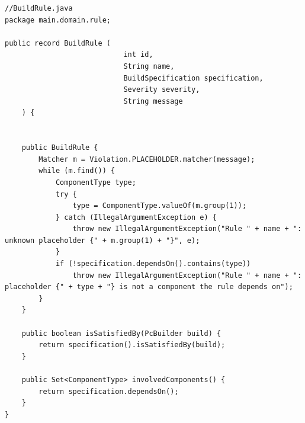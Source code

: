 \documentclass[12pt,a4paper]{article}
\begin{document}
\begin{lstlisting}[style=intellijlight, caption={A simple Java class}, label={lst:hello}]
//BuildRule.java
package main.domain.rule;

public record BuildRule (
                            int id,
                            String name,
                            BuildSpecification specification,
                            Severity severity,
                            String message
    ) {


    public BuildRule {
        Matcher m = Violation.PLACEHOLDER.matcher(message);
        while (m.find()) {
            ComponentType type;
            try {
                type = ComponentType.valueOf(m.group(1));
            } catch (IllegalArgumentException e) {
                throw new IllegalArgumentException("Rule " + name + ": unknown placeholder {" + m.group(1) + "}", e);
            }
            if (!specification.dependsOn().contains(type))
                throw new IllegalArgumentException("Rule " + name + ": placeholder {" + type + "} is not a component the rule depends on");
        }
    }

    public boolean isSatisfiedBy(PcBuilder build) {
        return specification().isSatisfiedBy(build);
    }

    public Set<ComponentType> involvedComponents() {
        return specification.dependsOn();
    }
}

\end{lstlisting}
\end{document}
